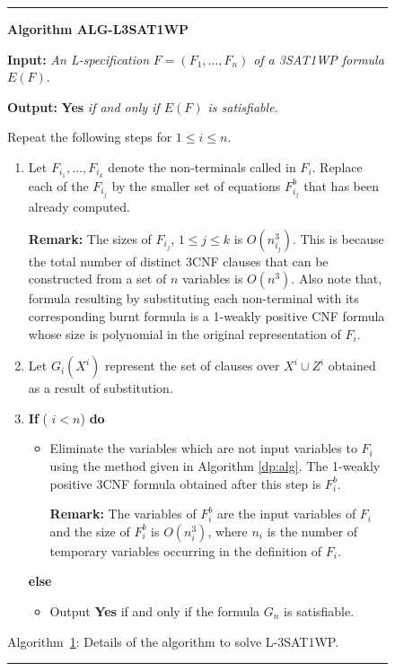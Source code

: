 \smallspacing
{\small
\begin{figure}[tbp]
\rule{16.4cm}{0.01in}

\noindent
{\bf Algorithm ALG-L3SAT1WP} 

\noindent
{\bf Input:} {\it An L-specification} $F = (F_1, \ldots , F_n)$
{\it of a 3SAT1WP formula } $E(F)$.  

\noindent
{\bf Output:} {\bf Yes} {\it if and only if $E(F)$ is satisfiable.} 

\noindent
Repeat the following steps for $1 \leq i \leq n$.

\begin{enumerate}
\item
Let $F_{i_1}, \ldots, F_{i_k}$ denote the non-terminals called in $F_i$.
Replace each of the $F_{i_j}$ by the smaller set of equations $F^b_{i_j}$
that has been already computed.

\noindent
{\bf Remark:} The sizes of $F_{i_j}$, $ 1 \leq j \leq k$ is $O(n_{i_j}^3)$.
This is because the total number of distinct {\sf 3CNF} clauses that can be
constructed from a set of $n$ variables is $O(n^3)$.
Also note that, formula resulting by substituting each non-terminal with 
its corresponding burnt formula is a 1-weakly positive {\sf CNF} formula 
whose size is polynomial in the original representation of $F_i$.

\item 
Let $G_i(X^i)$ represent the set of clauses  over $X^i \cup Z^i$
obtained as a result of substitution.

\item
{\bf If} ( $ i < n  $) {\bf do}
\begin{itemize}
\item
Eliminate the variables which are
not input variables to $F_i$ 
using the method given in Algorithm \ref{dp:alg}.
The 1-weakly positive {\sf 3CNF} formula obtained after this step is $F^b_i$.

\noindent
{\bf Remark:} The variables of $F^b_i$ are the input variables of $F_i$
and the size of $F^b_i$ is $O(n_i^3)$, where $n_i$ is the number of temporary
variables occurring in the definition of $F_i$.

\end{itemize}
{\bf else}
\begin{itemize}
\item
Output {\bf Yes} if and only if the formula $G_n$ is satisfiable.
\end{itemize}
\end{enumerate}


\label{l3sat1wp:alg}
\begin{center}
Algorithm~\ref{l3sat1wp:alg}: Details of the algorithm to solve 
{\sf L-3SAT1WP}.
\end{center}
\vspace*{-.2in}
\rule{16.4cm}{0.01in}
\end{figure}
}

